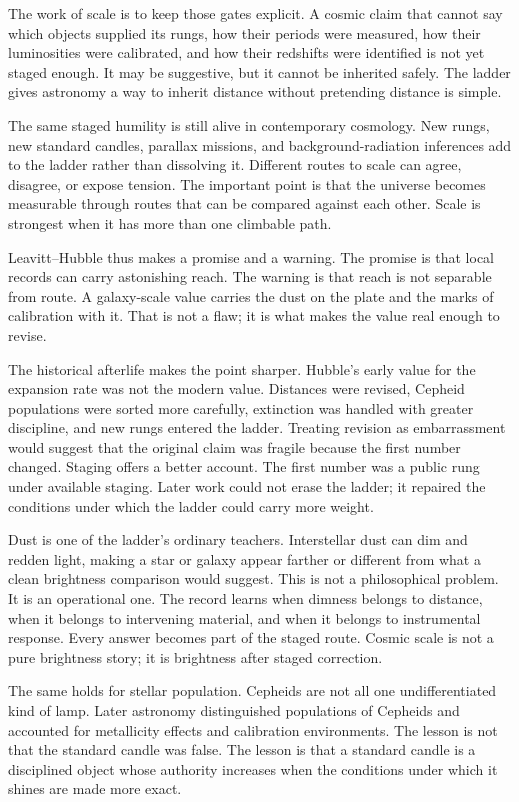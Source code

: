 The work of scale is to keep those gates explicit. A cosmic claim that
cannot say which objects supplied its rungs, how their periods were
measured, how their luminosities were calibrated, and how their redshifts
were identified is not yet staged enough. It may be suggestive, but it
cannot be inherited safely. The ladder gives astronomy a way to inherit
distance without pretending distance is simple.

The same staged humility is still alive in contemporary cosmology. New
rungs, new standard candles, parallax missions, and background-radiation
inferences add to the ladder rather than dissolving it. Different routes
to scale can agree, disagree, or expose tension. The important point is
that the universe becomes measurable through routes that can be compared
against each other. Scale is strongest when it has more than one climbable
path.

Leavitt--Hubble thus makes a promise and a warning. The promise is that
local records can carry astonishing reach. The warning is that reach is
not separable from route. A galaxy-scale value carries the dust on the
plate and the marks of calibration with it. That is not a flaw; it is
what makes the value real enough to revise.

The historical afterlife makes the point sharper. Hubble's early value for
the expansion rate was not the modern value. Distances were revised,
Cepheid populations were sorted more carefully, extinction was handled
with greater discipline, and new rungs entered the ladder. Treating
revision as embarrassment would suggest that the original claim was
fragile because the first number changed. Staging offers a better account.
The first number was a public rung under available staging. Later work
could not erase the ladder; it repaired the conditions under which the
ladder could carry more weight.

Dust is one of the ladder's ordinary teachers. Interstellar dust can dim
and redden light, making a star or galaxy appear farther or different from
what a clean brightness comparison would suggest. This is not a
philosophical problem. It is an operational one. The record learns when
dimness belongs to distance, when it belongs to intervening material, and
when it belongs to instrumental response. Every answer becomes part of the
staged route. Cosmic scale is not a pure brightness story; it is
brightness after staged correction.

The same holds for stellar population. Cepheids are not all one
undifferentiated kind of lamp. Later astronomy distinguished populations
of Cepheids and accounted for metallicity effects and calibration
environments. The lesson is not that the standard candle was false. The
lesson is that a standard candle is a disciplined object whose authority
increases when the conditions under which it shines are made more exact.

